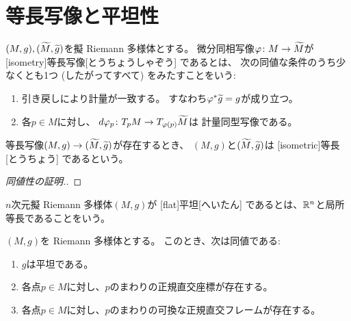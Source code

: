 \documentclass[report]{jlreq}
\begin{document}
%
\section{等長写像と平坦性}

\begin{definition}[等長写像]
    $(M, g), (\widetilde{M}, \widetilde{g})$を擬 Riemann 多様体とする。
    微分同相写像$\varphi \colon M \to \widetilde{M}$が
    [isometry]{等長写像}[とうちょうしゃぞう]
    であるとは、
    次の同値な条件のうち少なくとも1つ (したがってすべて) をみたすことをいう:
    \begin{enumerate}
        \item 引き戻しにより計量が一致する。
            すなわち$\varphi^* \widetilde{g} = g$が成り立つ。
        \item 各$p \in M$に対し、
            $d\varphi_p \colon T_p M \to T_{\varphi(p)} \widetilde{M}$は
            計量同型写像である。
    \end{enumerate}
    等長写像$(M, g) \to (\widetilde{M}, \widetilde{g})$が存在するとき、
    $(M, g)$と$(\widetilde{M}, \widetilde{g})$は
    [isometric]{等長}[とうちょう]
    であるという。
\end{definition}

\begin{proof}[同値性の証明.]
    \TODO{}
\end{proof}

\begin{definition}[局所等長]
    \TODO{}
\end{definition}

\begin{definition}[平坦]
    $n$次元擬 Riemann 多様体$(M, g)$が
    [flat]{平坦}[へいたん]
    であるとは、$\mathbb{R}^n$と局所等長であることをいう。
\end{definition}

\begin{theorem}[平坦性と正規直交フレーム]
    $(M, g)$を Riemann 多様体とする。
    このとき、次は同値である:
    \begin{enumerate}
        \item $g$は平坦である。
        \item 各点$p \in M$に対し、$p$のまわりの正規直交座標が存在する。
        \item 各点$p \in M$に対し、$p$のまわりの可換な正規直交フレームが存在する。
    \end{enumerate}
\end{theorem}
\end{document}

